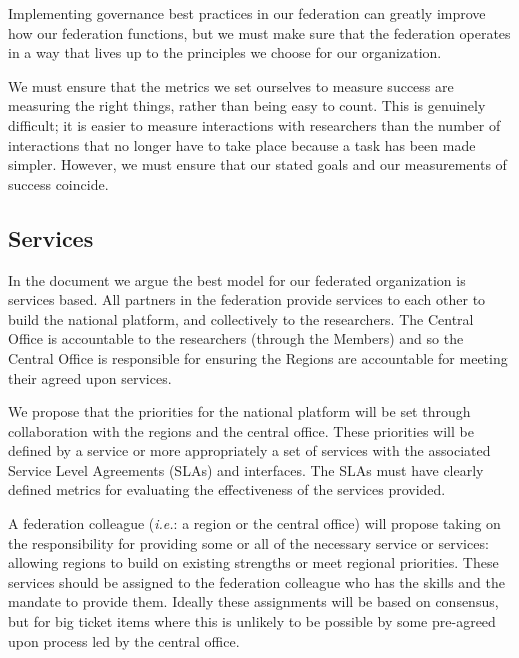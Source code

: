 \documentclass[11pt, letterpaper, twoside]{article}
\begin{document}
Implementing governance best practices in our federation can greatly
improve how our federation functions, but we must make sure that the
federation operates in a way that lives up to the principles we choose
for our organization.


We must ensure that the metrics we set ourselves to measure success are
measuring the right things, rather than being easy to count.  This is
genuinely difficult; it is easier to measure interactions with
researchers than the number of interactions that no longer have to take
place because a task has been made simpler.  However, we must ensure that
our stated goals and our measurements of success coincide.

\subsection*{Services}
%

In the document we argue the best model for our federated organization
is services based. All partners in the federation provide services to
each other to build the national platform, and collectively to the
researchers. The Central Office is accountable to the researchers
(through the Members) and so the Central Office is responsible for
ensuring the Regions are accountable for meeting their agreed upon
services.

We propose that the priorities for the national platform will be set
through collaboration with the regions and the central office. These
priorities will be defined by a service or more appropriately a set of
services with the associated Service Level Agreements (SLAs) and
interfaces. The SLAs must have clearly defined metrics for evaluating
the effectiveness of the services provided.


A federation colleague (\textit{i.e.}: a region or the central office) will 
propose taking on the responsibility for providing some or all of the
necessary service or services: allowing regions to build on existing
strengths or meet regional priorities. These services should be assigned
to the federation colleague who has the skills and the mandate to
provide them. Ideally these assignments will be based on consensus, but
for big ticket items where this is unlikely to be possible by some
pre-agreed upon process led by the central office.
\end{document}
